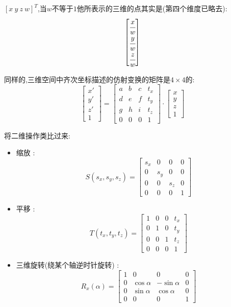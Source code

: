 {{{      $\left[x\ y\ z\ w\right]^T$,当$w$不等于$1$他所表示的三维的点其实是(第四个维度已略去):
      $$\begin{bmatrix}
          \cfrac{x}{w} \\
          \cfrac{y}{w} \\
          \cfrac{z}{w} \\
        \end{bmatrix}$$

      同样的,三维空间中齐次坐标描述的仿射变换的矩阵是$4 \times 4$的:
      $$\begin{bmatrix}
          x\prime \\
          y\prime \\
          z\prime \\
          1
        \end{bmatrix}
        =
        \begin{bmatrix}
          a & b & c & t_x \\
          d & e & f & t_y \\
          g & h & i & t_z \\
          0 & 0 & 0 & 1
        \end{bmatrix}
        \cdot
        \begin{bmatrix}
          x \\
          y \\
          z \\
          1
        \end{bmatrix}$$

      将二维操作类比过来:

      \begin{itemize}
        \item 缩放 : $$
                S(s_x,s_y,s_z) =\begin{bmatrix}
                  s_x & 0   & 0   & 0 \\
                  0   & s_y & 0   & 0 \\
                  0   & 0   & s_z & 0 \\
                  0   & 0   & 0   & 1
                \end{bmatrix}
              $$
        \item 平移 : $$
                T(t_x,t_y,t_z) = \begin{bmatrix}
                  1 & 0 & 0 & t_x \\
                  0 & 1 & 0 & t_y \\
                  0 & 0 & 1 & t_z \\
                  0 & 0 & 0 & 1
                \end{bmatrix}
              $$
        \item 三维旋转(绕某个轴逆时针旋转) :
              $$
                R_x(\alpha) = \begin{bmatrix}
                  1 & 0          & 0           & 0 \\
                  0 & \cos\alpha & -\sin\alpha & 0 \\
                  0 & \sin\alpha & \cos\alpha  & 0 \\
                  0 & 0          & 0           & 1
                \end{bmatrix}
              $$


\end{itemize}}}}
